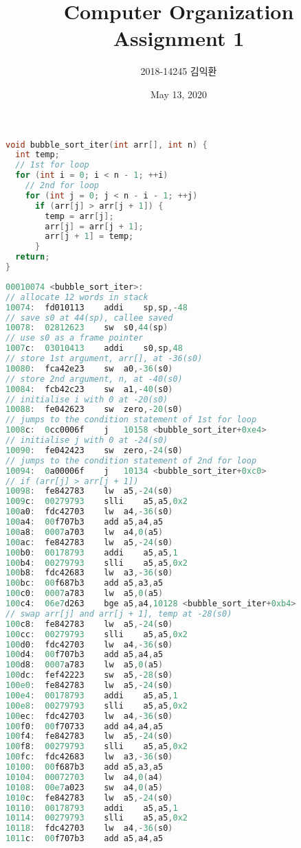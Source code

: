 \documentclass[
    a4paper,
    oneside,
    adjustmath,
    finemath,
    itemph,
    nonfrench,
    11pt
]{oblivoir}
\title{Computer Organization\\Assignment 1}
\author{2018-14245 김익환}
\date{May 13, 2020}
\begin{document}
    \maketitle
    \begin{lstlisting}[language=C, caption=C code of iterative bubble sort, label=lst:iter_C]
void bubble_sort_iter(int arr[], int n) {
  int temp;
  // 1st for loop
  for (int i = 0; i < n - 1; ++i)
    // 2nd for loop
    for (int j = 0; j < n - i - 1; ++j)
      if (arr[j] > arr[j + 1]) {
        temp = arr[j];
        arr[j] = arr[j + 1];
        arr[j + 1] = temp;
      }
  return;
}
    \end{lstlisting}
    \begin{lstlisting}[language=C, caption=RV32I code of iterative bubble sort, label=lst:iter_RV32I]
00010074 <bubble_sort_iter>:
// allocate 12 words in stack
10074:	fd010113	addi	sp,sp,-48
// save s0 at 44(sp), callee saved
10078:	02812623	sw	s0,44(sp)
// use s0 as a frame pointer
1007c:	03010413	addi	s0,sp,48
// store 1st argument, arr[], at -36(s0)
10080:	fca42e23	sw	a0,-36(s0)
// store 2nd argument, n, at -40(s0)
10084:	fcb42c23	sw	a1,-40(s0)
// initialise i with 0 at -20(s0)
10088:	fe042623	sw	zero,-20(s0)
// jumps to the condition statement of 1st for loop
1008c:	0cc0006f	j	10158 <bubble_sort_iter+0xe4>
// initialise j with 0 at -24(s0)
10090:	fe042423	sw	zero,-24(s0)
// jumps to the condition statement of 2nd for loop
10094:	0a00006f	j	10134 <bubble_sort_iter+0xc0>
// if (arr[j] > arr[j + 1])
10098:	fe842783	lw	a5,-24(s0)
1009c:	00279793	slli	a5,a5,0x2
100a0:	fdc42703	lw	a4,-36(s0)
100a4:	00f707b3	add	a5,a4,a5
100a8:	0007a703	lw	a4,0(a5)
100ac:	fe842783	lw	a5,-24(s0)
100b0:	00178793	addi	a5,a5,1
100b4:	00279793	slli	a5,a5,0x2
100b8:	fdc42683	lw	a3,-36(s0)
100bc:	00f687b3	add	a5,a3,a5
100c0:	0007a783	lw	a5,0(a5)
100c4:	06e7d263	bge	a5,a4,10128 <bubble_sort_iter+0xb4>
// swap arr[j] and arr[j + 1], temp at -28(s0)
100c8:	fe842783	lw	a5,-24(s0)
100cc:	00279793	slli	a5,a5,0x2
100d0:	fdc42703	lw	a4,-36(s0)
100d4:	00f707b3	add	a5,a4,a5
100d8:	0007a783	lw	a5,0(a5)
100dc:	fef42223	sw	a5,-28(s0)
100e0:	fe842783	lw	a5,-24(s0)
100e4:	00178793	addi	a5,a5,1
100e8:	00279793	slli	a5,a5,0x2
100ec:	fdc42703	lw	a4,-36(s0)
100f0:	00f70733	add	a4,a4,a5
100f4:	fe842783	lw	a5,-24(s0)
100f8:	00279793	slli	a5,a5,0x2
100fc:	fdc42683	lw	a3,-36(s0)
10100:	00f687b3	add	a5,a3,a5
10104:	00072703	lw	a4,0(a4)
10108:	00e7a023	sw	a4,0(a5)
1010c:	fe842783	lw	a5,-24(s0)
10110:	00178793	addi	a5,a5,1
10114:	00279793	slli	a5,a5,0x2
10118:	fdc42703	lw	a4,-36(s0)
1011c:	00f707b3	add	a5,a4,a5

\end{lstlisting}
\end{document}
